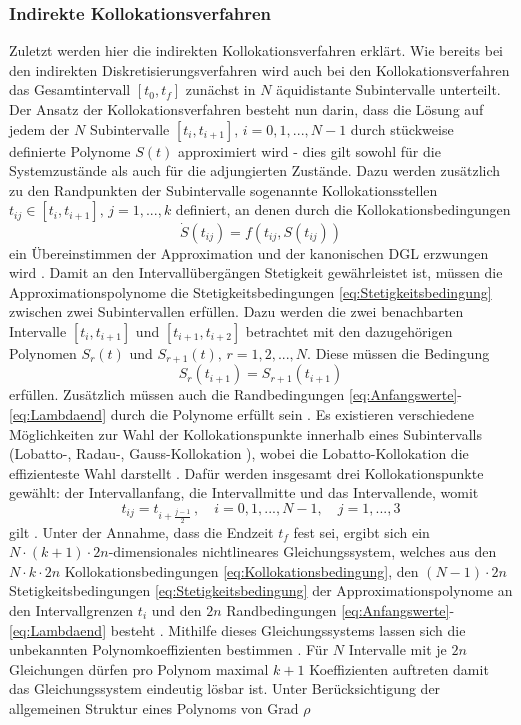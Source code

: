 \subsubsection{Indirekte Kollokationsverfahren}\label{subsubsec:Kollokationsverfahren_indirekt}
Zuletzt werden hier die indirekten Kollokationsverfahren erklärt. Wie bereits bei den indirekten Diskretisierungsverfahren wird auch bei den Kollokationsverfahren das Gesamtintervall $[t_0, t_f]$ zunächst in $N$ äquidistante Subintervalle unterteilt. Der Ansatz der Kollokationsverfahren besteht nun darin, dass die Lösung auf jedem der $N$ Subintervalle $[t_i, t_{i+1}],\, i = 0,1,...,N-1$ durch stückweise definierte Polynome $S(t)$ approximiert wird \cite{Gerdts.2010} - dies gilt sowohl für die Systemzustände als auch für die adjungierten Zustände. Dazu werden zusätzlich zu den Randpunkten der Subintervalle sogenannte Kollokationsstellen $t_{ij} \in [t_i, t_{i+1}],\, j = 1,...,k$ definiert, an denen durch die Kollokationsbedingungen  
\begin{equation}
	\dot{S}(t_{ij}) = f(t_{ij},S(t_{ij})) \label{eq:Kollokationsbedingung}
\end{equation}
ein Übereinstimmen der Approximation und der kanonischen \gls{DGL} erzwungen wird \cite{Gerdts.2010}. Damit an den Intervallübergängen Stetigkeit gewährleistet ist, müssen die Approximationspolynome die Stetigkeitsbedingungen \eqref{eq:Stetigkeitsbedingung} zwischen zwei Subintervallen erfüllen. Dazu werden die zwei benachbarten Intervalle $[t_i, t_{i+1}]$ und $[t_{i+1}, t_{i+2}]$ betrachtet mit den dazugehörigen Polynomen $S_r(t)$ und $S_{r+1}(t),\, r = 1,2,...,N$. Diese müssen die Bedingung
\begin{equation}
S_r(t_{i+1}) = S_{r+1}(t_{i+1}) \label{eq:Stetigkeitsbedingung}
\end{equation} 
erfüllen. Zusätzlich müssen auch die Randbedingungen \eqref{eq:Anfangswerte}-\eqref{eq:Lambdaend} durch die Polynome erfüllt sein \cite{Gerdts.2010}. Es existieren verschiedene Möglichkeiten zur Wahl der Kollokationspunkte innerhalb eines Subintervalls (Lobatto-, Radau-, Gauss-Kollokation \cite{Weiss.1974}), wobei die Lobatto-Kollokation die effizienteste Wahl darstellt \cite{Weiss.1974}. Dafür werden insgesamt drei Kollokationspunkte gewählt: der Intervallanfang, die Intervallmitte und das Intervallende, womit 
\begin{equation}
	t_{ij} = t_{i+\frac{j-1}{2}}\,,\quad i = 0,1,...,N-1,\quad j = 1,...,3
\end{equation}
gilt \cite{Papageorgiou.2012}. Unter der Annahme, dass die Endzeit $t_f$ fest sei, ergibt sich ein $N\cdot (k+1)\cdot 2n$-dimensionales nichtlineares Gleichungssystem, welches aus den $N\cdot k\cdot 2n$ Kollokationsbedingungen \eqref{eq:Kollokationsbedingung}, den $(N-1)\cdot 2n$ Stetigkeitsbedingungen \eqref{eq:Stetigkeitsbedingung} der Approximationspolynome an den Intervallgrenzen $t_i$ und den $2n$ Randbedingungen \eqref{eq:Anfangswerte}-\eqref{eq:Lambdaend} besteht \cite{Gerdts.2010}. Mithilfe dieses Gleichungssystems lassen sich die unbekannten Polynomkoeffizienten bestimmen \cite{Gerdts.2010}. Für $N$ Intervalle mit je $2n$ Gleichungen dürfen pro Polynom maximal $k+1$ Koeffizienten auftreten damit das Gleichungssystem eindeutig lösbar ist. Unter Berücksichtigung der allgemeinen Struktur eines Polynoms von Grad $\rho$
